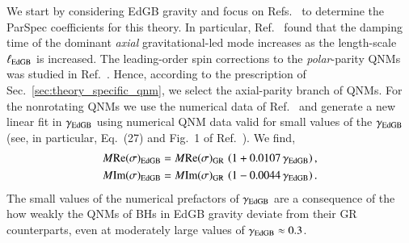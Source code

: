 \documentclass[twocolumn,
               prd,
               aps,
               superscriptaddress,
               tightenlines,
               nofootinbib,
               eqsecnum,
               amsfonts,
               amsmath,
               longbibliography]{revtex4-1}
\newcommand{\abcomm}[1]{{\textcolor{red}{{[AB: #1]}}}}
\begin{document}
We start by considering EdGB gravity and focus on
Refs.~\cite{Blazquez-Salcedo:2016enn,Pierini:2021jxd} to determine the ParSpec coefficients for this theory.
%
In particular, Ref.~\cite{Blazquez-Salcedo:2016enn} found that the damping time
of the dominant \emph{axial} gravitational-led mode increases as the length-scale
$\ell_{\rm EdGB}$ is increased. The leading-order spin corrections to the
\emph{polar}-parity QNMs was studied in Ref.~\cite{Pierini:2021jxd}.
%
Hence, according to the prescription of Sec.~\ref{sec:theory_specific_qnm},
we select the axial-parity branch of QNMs.
%
%
For the nonrotating QNMs we use
the numerical data of Ref.~\cite{Blazquez-Salcedo:2016enn} and
generate a new linear fit in $\gamma_{\rm EdGB}$ using numerical QNM data valid for small
values of the $\gamma_{\rm EdGB}$ (see, in particular, Eq.~(27) and Fig.~1 of
Ref.~\cite{Blazquez-Salcedo:2016enn}).
%
We find,
%
\begin{subequations}
\begin{align}
    M {\rm Re}(\sigma)_{\rm EdGB} &= M {\rm Re}(\sigma)_{\rm GR} \, \left( 1 + 0.0107 \, \gamma_{\rm EdGB} \right),
    \\
    M {\rm Im}(\sigma)_{\rm EdGB} &= M {\rm Im}(\sigma)_{\rm GR} \, \left( 1 - 0.0044 \, \gamma_{\rm EdGB} \right).
\end{align}
\end{subequations}
%
The small values of the numerical prefactors of $\gamma_{\rm EdGB}$ are a consequence of the how weakly the QNMs
of BHs in EdGB gravity deviate from their GR counterparts, even at moderately large values of $\gamma_{\rm EdGB} \approx 0.3$.
\end{document}
